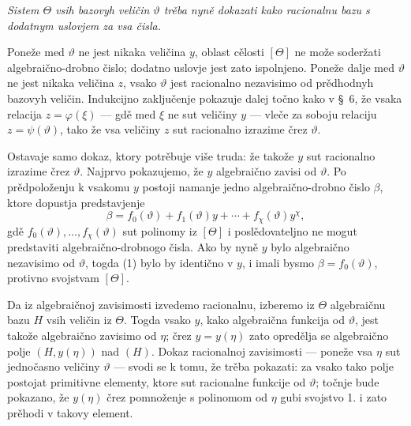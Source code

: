 \documentclass[11pt]{article}
\begin{document}
{\itshape Sistem $\Theta$ vsih bazovyh veličin $\vartheta$ trěba nyně dokazati
kako racionalnu bazu s dodatnym uslovjem za vsa čisla.}

Poneže med $\vartheta$ ne jest nikaka veličina $y$, oblast cělosti $[\Theta]$
ne može soderžati algebraično-drobno čislo; dodatno uslovje jest zato
ispolnjeno. Poneže dalje med $\vartheta$ ne jest nikaka veličina $z$, vsako
$\vartheta$ jest racionalno nezavisimo od prědhodnyh bazovyh veličin.
Indukcijno zaključenje pokazuje dalej točno kako v \S\ 6, že vsaka relacija
$z=\varphi(\xi)$ --- gdě med $\xi$ ne sut veličiny $y$ --- vleče za soboju
relaciju $z=\psi(\vartheta)$, tako že vsa veličiny $z$ sut racionalno izrazime
črez $\vartheta$.

Ostavaje samo dokaz, ktory potrěbuje više truda: že takože $y$ sut racionalno
izrazime črez $\vartheta$. Najprvo pokazujemo, že $y$ algebraično zavisi od
$\vartheta$. Po prědpoloženju k vsakomu $y$ postoji namanje jedno
algebraično-drobno čislo $\beta$, ktore dopustja predstavjenje
\begin{equation}
\beta=f_0(\vartheta)+f_1(\vartheta)y+\cdots+f_\chi(\vartheta)y^\chi,
\tag{1}
\end{equation}
gdě $f_0(\vartheta),\ldots,f_\chi(\vartheta)$ sut polinomy iz $[\Theta]$ i
poslědovateljno ne mogut predstaviti algebraično-drobnogo čisla. Ako by nyně
$y$ bylo algebraično nezavisimo od $\vartheta$, togda (1) bylo by identično v
$y$, i imali bysmo $\beta=f_0(\vartheta)$, protivno svojstvam $[\Theta]$.

Da iz algebraičnoj zavisimosti izvedemo racionalnu, izberemo iz $\Theta$
algebraičnu bazu $H$ vsih veličin iz $\Theta$. Togda vsako $y$, kako
algebraična funkcija od $\vartheta$, jest takože algebraično zavisimo od
$\eta$; črez $y=y(\eta)$ zato opredělja se algebraično polje $(H,y(\eta))$ nad
$(H)$. Dokaz racionalnoj zavisimosti --- poneže vsa $\eta$ sut jednočasno
veličiny $\vartheta$ --- svodi se k tomu, že trěba pokazati: za vsako tako polje
postojat primitivne elementy, ktore sut racionalne funkcije od
$\vartheta$; točnje bude pokazano, že $y(\eta)$ črez pomnoženje s polinomom od
$\eta$ gubi svojstvo 1. i zato prěhodi v takovy element.
\end{document}
